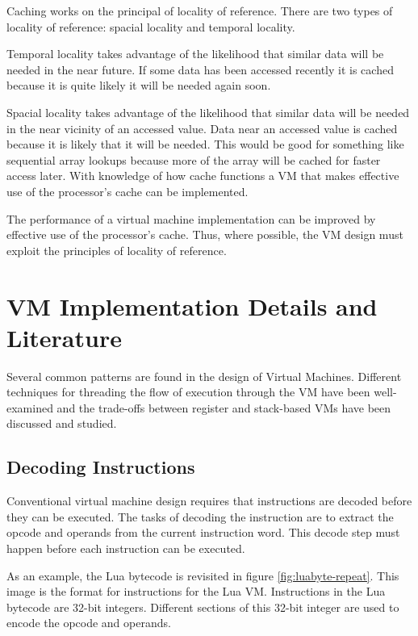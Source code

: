 \documentclass[english,a4paper,12pt]{report}
\begin{document}
Caching works on the principal of locality of reference. There are two
types of locality of reference: spacial locality and temporal
locality.

Temporal locality takes advantage of the likelihood that similar data
will be needed in the near future. If some data has been accessed
recently it is cached because it is quite likely it will be needed
again soon.

Spacial locality takes advantage of the likelihood that similar data
will be needed in the near vicinity of an accessed value. Data near an
accessed value is cached because it is likely that it will be
needed. This would be good for something like sequential array lookups
because more of the array will be cached for faster access later. With
knowledge of how cache functions a VM that makes effective use of the
processor's cache can be implemented.

The performance of a virtual machine implementation can be improved by
effective use of the processor's cache. Thus, where possible, the VM
design must exploit the principles of locality of reference.

\section{VM Implementation Details and Literature}
\label{sec:conv-impl}

Several common patterns are found in the design of Virtual
Machines. Different techniques for threading the flow of execution
through the VM have been well-examined and the trade-offs between
register and stack-based VMs have been discussed and studied.

\subsection{Decoding Instructions}
\label{sec:decode}
Conventional virtual machine design requires that instructions are
decoded before they can be executed. The tasks of decoding the
instruction are to extract the opcode and operands from the current
instruction word. This decode step must happen before each
instruction can be executed. 

As an example, the Lua bytecode is revisited in figure
\ref{fig:luabyte-repeat}. This image is the format for instructions
for the Lua VM. Instructions in the Lua bytecode are 32-bit
integers. Different sections of this 32-bit integer are used to encode
the opcode and operands.
\end{document}
